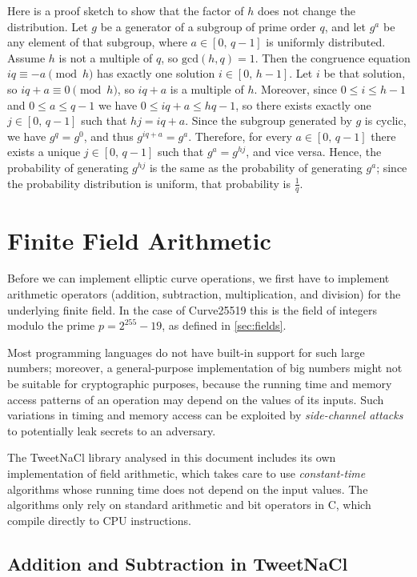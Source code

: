 \documentclass{article}
\begin{document}
Here is a proof sketch to show that the factor of $h$ does not change the distribution.
Let $g$ be a generator of a subgroup of prime order $q$, and let $g^a$ be any element of that subgroup, where $a \in [0,\, q-1]$ is uniformly distributed.
Assume $h$ is not a multiple of $q$, so $\mathrm{gcd}(h, q) = 1$.
Then the congruence equation $iq \equiv -a \pmod{h}$ has exactly one solution $i \in [0,\, h-1]$.
Let $i$ be that solution, so $iq + a \equiv 0 \pmod{h}$, so $iq + a$ is a multiple of $h$.
Moreover, since $0 \le i \le h-1$ and $0 \le a \le q-1$ we have $0 \le iq + a \le hq - 1$, so there exists exactly one $j \in [0,\, q-1]$ such that $hj = iq + a$.
Since the subgroup generated by $g$ is cyclic, we have $g^{q} = g^0$, and thus $g^{iq+a} = g^a$.
Therefore, for every $a \in [0,\, q-1]$ there exists a unique $j \in [0,\, q-1]$ such that $g^a = g^{hj}$, and vice versa.
Hence, the probability of generating $g^{hj}$ is the same as the probability of generating $g^a$; since the probability distribution is uniform, that probability is $\frac{1}{q}$.

\section{Finite Field Arithmetic}\label{sec:field-arithmetic}

Before we can implement elliptic curve operations, we first have to implement arithmetic operators (addition, subtraction, multiplication, and division) for the underlying finite field.
In the case of Curve25519 this is the field of integers modulo the prime $p = 2^{255} - 19$, as defined in \autoref{sec:fields}.

Most programming languages do not have built-in support for such large numbers; moreover, a general-purpose implementation of big numbers might not be suitable for cryptographic purposes, because the running time and memory access patterns of an operation may depend on the values of its inputs.
Such variations in timing and memory access can be exploited by \emph{side-channel attacks} to potentially leak secrets to an adversary.

The TweetNaCl library analysed in this document includes its own implementation of field arithmetic, which takes care to use \emph{constant-time} algorithms whose running time does not depend on the input values.
The algorithms only rely on standard arithmetic and bit operators in C, which compile directly to CPU instructions.

\subsection{Addition and Subtraction in TweetNaCl}
\end{document}
